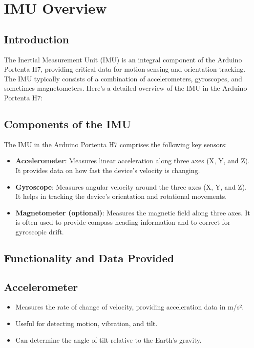 	\section{IMU Overview}
	\subsection{Introduction}
	The Inertial Measurement Unit (IMU) is an integral component of the Arduino Portenta H7, providing critical data for motion sensing and orientation tracking. The IMU typically consists of a combination of accelerometers, gyroscopes, and sometimes magnetometers. Here's a detailed overview of the IMU in the Arduino Portenta H7:
	
	\subsection{Components of the IMU}
	The IMU in the Arduino Portenta H7 comprises the following key sensors:
	\begin{itemize}
		\item \textbf{Accelerometer}: Measures linear acceleration along three axes (X, Y, and Z). It provides data on how fast the device's velocity is changing.
		\item \textbf{Gyroscope}: Measures angular velocity around the three axes (X, Y, and Z). It helps in tracking the device's orientation and rotational movements.
		\item \textbf{Magnetometer (optional)}: Measures the magnetic field along three axes. It is often used to provide compass heading information and to correct for gyroscopic drift.
	\end{itemize}
	
	\subsection{Functionality and Data Provided}
	
	\subsection{Accelerometer}
	\begin{itemize}
		\item Measures the rate of change of velocity, providing acceleration data in m/s².
		\item Useful for detecting motion, vibration, and tilt.
		\item Can determine the angle of tilt relative to the Earth's gravity.
	\end{itemize}
	
